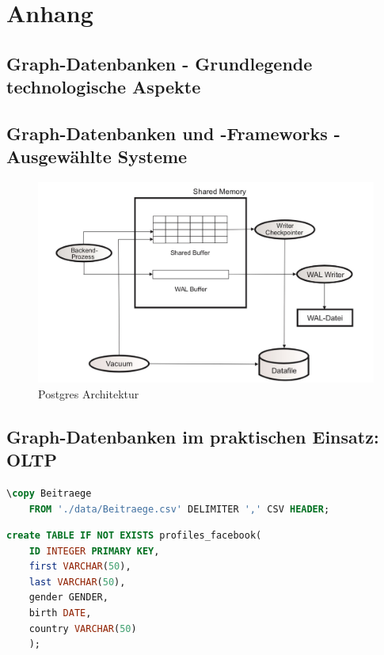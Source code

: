 \appendix
\chapter{Anhang}
\section{Graph-Datenbanken - Grundlegende technologische Aspekte}
\section{Graph-Datenbanken und -Frameworks - Ausgewählte Systeme}
\begin{figure}[H]

    \includegraphics[width = \linewidth]{images/postgresArchitektur.jpg}
    \caption{Postgres Architektur}
    \label{2.Postgres Architektur.image}

\end{figure}
\section{Graph-Datenbanken im praktischen Einsatz: OLTP}
\begin{lstlisting}[language=SQL,caption=CSV Input,frame=single, label={2.copy.listing}]
    \copy Beitraege
    FROM './data/Beitraege.csv' DELIMITER ',' CSV HEADER;
\end{lstlisting}

\begin{lstlisting}[language=SQL,caption=Anlegen der Tabelle facebook-profiles,frame=single, label={2.facebookProfiles.listing}]
    create TABLE IF NOT EXISTS profiles_facebook(
    ID INTEGER PRIMARY KEY,
    first VARCHAR(50),
    last VARCHAR(50),
    gender GENDER,
    birth DATE,
    country VARCHAR(50)
    );
\end{lstlisting}

